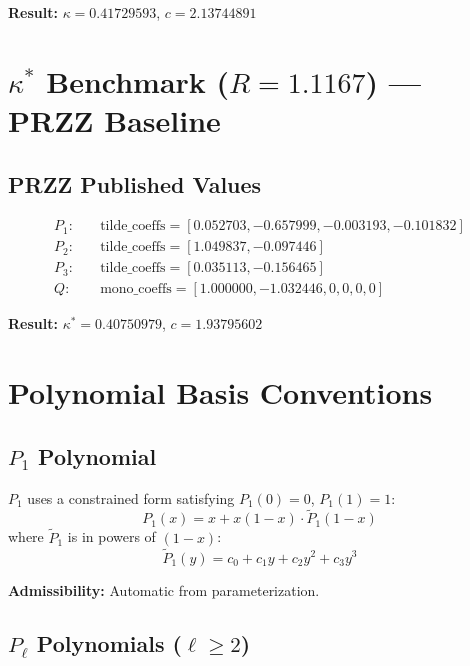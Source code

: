 \documentclass[11pt]{article}
\begin{document}
\textbf{Result:} $\kappa = 0.41729593$, $c = 2.13744891$

\section{$\kappa^*$ Benchmark ($R = 1.1167$) --- PRZZ Baseline}

\subsection{PRZZ Published Values}

\begin{align*}
P_1: \quad & \text{tilde\_coeffs} = [0.052703, -0.657999, -0.003193, -0.101832] \\
P_2: \quad & \text{tilde\_coeffs} = [1.049837, -0.097446] \\
P_3: \quad & \text{tilde\_coeffs} = [0.035113, -0.156465] \\
Q: \quad & \text{mono\_coeffs} = [1.000000, -1.032446, 0, 0, 0, 0]
\end{align*}

\textbf{Result:} $\kappa^* = 0.40750979$, $c = 1.93795602$

\section{Polynomial Basis Conventions}

\subsection{$P_1$ Polynomial}

$P_1$ uses a constrained form satisfying $P_1(0) = 0$, $P_1(1) = 1$:
\begin{equation}
P_1(x) = x + x(1-x) \cdot \tilde{P}_1(1-x)
\end{equation}
where $\tilde{P}_1$ is in powers of $(1-x)$:
\begin{equation}
\tilde{P}_1(y) = c_0 + c_1 y + c_2 y^2 + c_3 y^3
\end{equation}

\textbf{Admissibility:} Automatic from parameterization.

\subsection{$P_\ell$ Polynomials ($\ell \geq 2$)}
\end{document}
